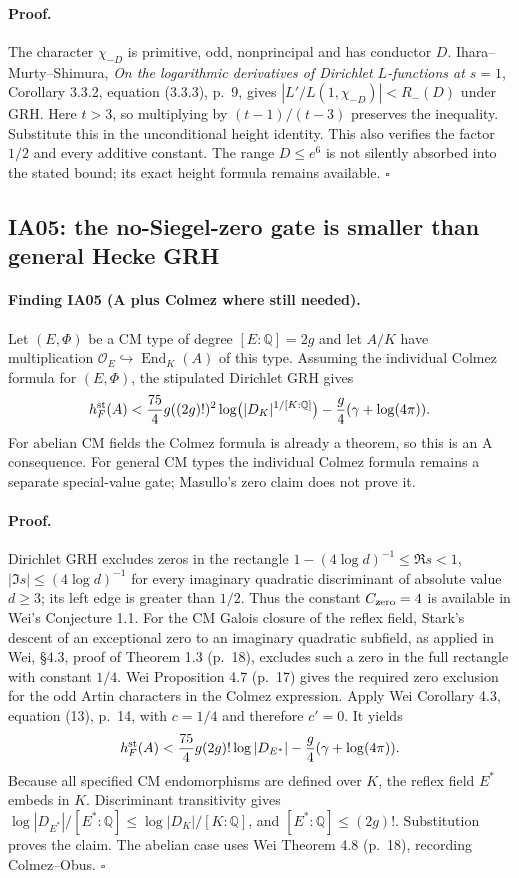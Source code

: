 \documentclass[11pt,a4paper]{article}
\theoremstyle{definition}
\begin{document}
\paragraph{Proof.}
The character $\chi_{-D}$ is primitive, odd, nonprincipal and has
conductor $D$.  Ihara--Murty--Shimura, \emph{On the logarithmic
derivatives of Dirichlet $L$-functions at $s=1$}, Corollary 3.3.2,
equation (3.3.3), p.~9, gives
$|L'/L(1,\chi_{-D})|<R_-(D)$ under GRH.  Here $t>3$, so multiplying
by $(t-1)/(t-3)$ preserves the inequality.  Substitute this in the
unconditional height identity.  This also verifies the factor $1/2$
and every additive constant.  The range $D\leq e^6$ is not silently
absorbed into the stated bound; its exact height formula remains
available. \hfill$\square$

\subsection{IA05: the no-Siegel-zero gate is smaller than general Hecke GRH}

\paragraph{Finding IA05 (A plus Colmez where still needed).}
Let $(E,\Phi)$ be a CM type of degree $[E:\mathbb Q]=2g$ and let
$A/K$ have multiplication $\mathcal O_E\hookrightarrow
\operatorname{End}_K(A)$ of this type.  Assuming the individual
Colmez formula for $(E,\Phi)$, the stipulated Dirichlet GRH gives
\[
 h_F^{\rm st}(A)<
 \frac{75}{4}g((2g)!)^2\log\bigl(|D_K|^{1/[K:\mathbb Q]}\bigr)
 -\frac g4(\gamma+\log(4\pi)).
\]
For abelian CM fields the Colmez formula is already a theorem, so this
is an A consequence.  For general CM types the individual Colmez
formula remains a separate special-value gate; Masullo's zero claim
does not prove it.

\paragraph{Proof.}
Dirichlet GRH excludes zeros in the rectangle
$1-(4\log d)^{-1}\leq\Re s<1$,
$|\Im s|\leq(4\log d)^{-1}$ for every imaginary quadratic
discriminant of absolute value $d\geq3$; its left edge is greater
than $1/2$.  Thus the constant $C_{\rm zero}=4$ is available in
Wei's Conjecture 1.1.  For the CM Galois closure of the reflex field,
Stark's descent of an exceptional zero to an imaginary quadratic
subfield, as applied in Wei, \S4.3, proof of Theorem 1.3 (p.~18),
excludes such a zero in the full rectangle with constant $1/4$.
Wei Proposition 4.7 (p.~17) gives the required zero exclusion for
the odd Artin characters in the Colmez expression.
Apply Wei Corollary 4.3, equation (13), p.~14, with $c=1/4$ and
therefore $c'=0$.  It yields
\[
 h_F^{\rm st}(A)<\frac{75}4g(2g)!\log|D_{E^*}|
                         -\frac g4(\gamma+\log(4\pi)).
\]
Because all specified CM endomorphisms are defined over $K$, the
reflex field $E^*$ embeds in $K$.  Discriminant transitivity gives
$\log|D_{E^*}|/[E^*:\mathbb Q]\leq
\log|D_K|/[K:\mathbb Q]$, and $[E^*:\mathbb Q]\leq(2g)!$.
Substitution proves the claim.  The abelian case uses Wei Theorem
4.8 (p.~18), recording Colmez--Obus. \hfill$\square$
\end{document}
